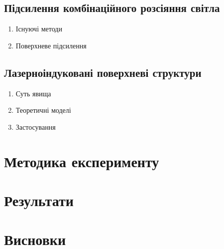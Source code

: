 \documentclass[a4paper]{article}
\begin{document}
        \subsection{Підсилення комбінаційного розсіяння світла}
            \begin{enumerate}
                \item{Існуючі методи}
                \item{Поверхневе підсилення}
            \end{enumerate}
        \subsection{Лазерноіндуковані поверхневі структури}
            \begin{enumerate}
                \item {Суть явища}
                \item {Теоретичні моделі}
                \item {Застосування}
            \end{enumerate}
    \section{Методика експерименту}
    \section{Результати}
    \section{Висновки}         
        
            
\end{document}
